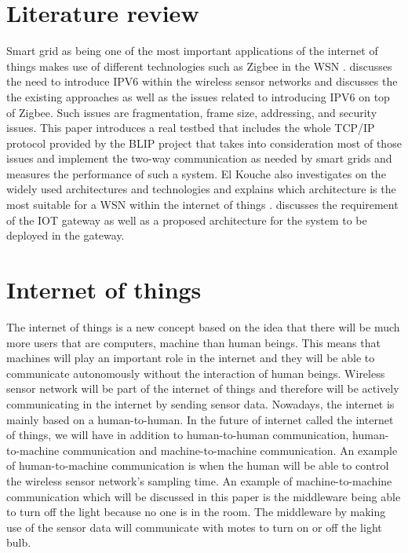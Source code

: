 \documentclass[conference]{IEEEtran}
\begin{document}
\section{Literature review}
Smart grid as being one of the most important applications of the internet of things makes use of different technologies such as Zigbee in the WSN \cite{ref1}.  \cite{ref2} discusses the need to introduce IPV6 within the wireless sensor networks and discusses the the existing approaches as well as the issues related to introducing IPV6 on top of Zigbee. Such issues are fragmentation, frame size, addressing, and security issues. This paper introduces a real testbed that includes the whole TCP/IP protocol provided by the BLIP project that takes into consideration most of those issues and implement the two-way communication as needed by smart grids and measures the performance of such a system. El Kouche also investigates on the widely used architectures and technologies and explains which architecture is the most suitable for a WSN within the internet of things \cite{ref3}. \cite{ref4} discusses the requirement of the IOT gateway as well as a proposed architecture for the system to be deployed in the gateway.
\section{Internet of things}
The internet of things is a new concept based on the idea that there will be much more users that are computers, machine than human beings. This means that machines will play an important role in the internet and they will be able to communicate autonomously without the interaction of human beings. Wireless sensor network will be part of the internet of things and therefore will be actively communicating in the internet by sending sensor data. Nowadays, the internet is mainly based on a human-to-human. In the future of internet called the internet of things, we will have in addition to human-to-human communication, human-to-machine communication and machine-to-machine communication. An example of human-to-machine communication is when the human will be able to control the wireless sensor network's sampling time. An example of machine-to-machine communication which will be discussed in this paper is the middleware being able to turn off the light because no one is in the room. The middleware by making use of the sensor data will communicate with motes to turn on or off the light bulb.
\end{document}
